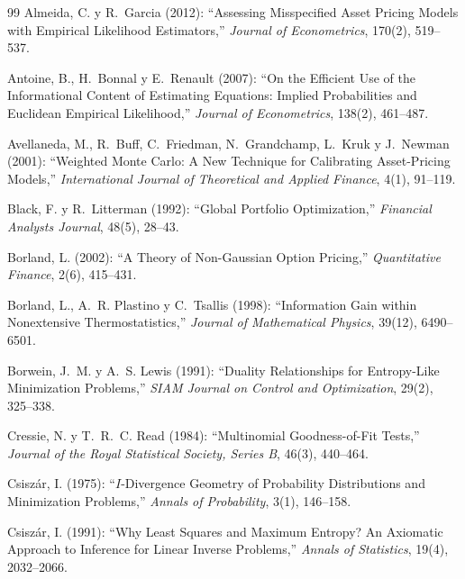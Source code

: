 \documentclass[11pt]{article}
\begin{document}
\begin{thebibliography}{99}
Almeida, C. y R.~Garcia (2012): ``Assessing Misspecified Asset Pricing
Models with Empirical Likelihood Estimators,'' \textit{Journal of
Econometrics}, 170(2), 519--537.

Antoine, B., H.~Bonnal y E.~Renault (2007): ``On the Efficient Use of the
Informational Content of Estimating Equations: Implied Probabilities and
Euclidean Empirical Likelihood,'' \textit{Journal of Econometrics}, 138(2),
461--487.

Avellaneda, M., R.~Buff, C.~Friedman, N.~Grandchamp, L.~Kruk y J.~Newman
(2001): ``Weighted Monte Carlo: A New Technique for Calibrating Asset-Pricing
Models,'' \textit{International Journal of Theoretical and Applied Finance},
4(1), 91--119.

Black, F. y R.~Litterman (1992): ``Global Portfolio Optimization,''
\textit{Financial Analysts Journal}, 48(5), 28--43.

Borland, L. (2002): ``A Theory of Non-Gaussian Option Pricing,''
\textit{Quantitative Finance}, 2(6), 415--431.

Borland, L., A.~R. Plastino y C.~Tsallis (1998): ``Information Gain within
Nonextensive Thermostatistics,'' \textit{Journal of Mathematical Physics},
39(12), 6490--6501.

Borwein, J.~M. y A.~S. Lewis (1991): ``Duality Relationships for
Entropy-Like Minimization Problems,'' \textit{SIAM Journal on Control and
Optimization}, 29(2), 325--338.

Cressie, N. y T.~R.~C. Read (1984): ``Multinomial Goodness-of-Fit
Tests,'' \textit{Journal of the Royal Statistical Society, Series B},
46(3), 440--464.

Csisz\'ar, I. (1975): ``$I$-Divergence Geometry of Probability
Distributions and Minimization Problems,'' \textit{Annals of Probability},
3(1), 146--158.

Csisz\'ar, I. (1991): ``Why Least Squares and Maximum Entropy? An Axiomatic
Approach to Inference for Linear Inverse Problems,'' \textit{Annals of
Statistics}, 19(4), 2032--2066.


\end{thebibliography}
\end{document}

